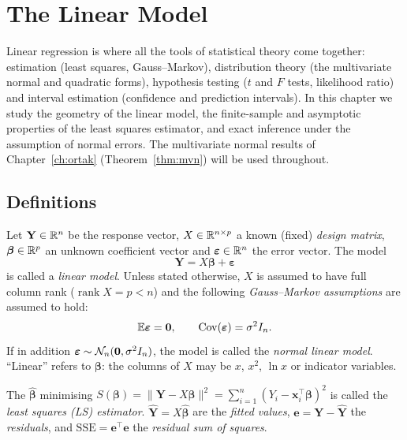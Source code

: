 \documentclass[main.tex]{subfiles}
\begin{document}
\chapter{The Linear Model}\label{ch:dogrusal}

Linear regression is where all the tools of statistical theory come together: estimation (least squares, Gauss--Markov), distribution theory (the multivariate normal and quadratic forms), hypothesis testing ($t$ and $F$ tests, likelihood ratio) and interval estimation (confidence and prediction intervals). In this chapter we study the geometry of the linear model, the finite-sample and asymptotic properties of the least squares estimator, and exact inference under the assumption of normal errors. The multivariate normal results of Chapter~\ref{ch:ortak} (Theorem~\ref{thm:mvn}) will be used throughout.

\section{Definitions}

\begin{definition}\label{def:dogrusal-model}
Let $\mathbf Y\in\mathbb{R}^n$ be the response vector, $X\in\mathbb{R}^{n\times p}$ a known (fixed) \emph{design matrix}, $\bm\beta\in\mathbb{R}^p$ an unknown coefficient vector and $\bm\varepsilon\in\mathbb{R}^n$ the error vector. The model
\[
\mathbf Y=X\bm\beta+\bm\varepsilon
\]
is called a \emph{linear model}. Unless stated otherwise, $X$ is assumed to have full column rank ($\operatorname{rank}X=p<n$) and the following \emph{Gauss--Markov assumptions} are assumed to hold:
\[
\mathbb{E}\bm\varepsilon=\mathbf 0,\qquad\operatorname{Cov}(\bm\varepsilon)=\sigma^2I_n .
\]
If in addition $\bm\varepsilon\sim\mathcal{N}_n(\mathbf 0,\sigma^2I_n)$, the model is called the \emph{normal linear model}. ``Linear'' refers to $\bm\beta$: the columns of $X$ may be $x$, $x^2$, $\ln x$ or indicator variables.
\end{definition}

\begin{definition}
The $\hat{\bm\beta}$ minimising $S(\bm\beta)=\|\mathbf Y-X\bm\beta\|^2=\sum_{i=1}^n(Y_i-\mathbf x_i^\top\bm\beta)^2$ is called the \emph{least squares (LS) estimator}. $\hat{\mathbf Y}=X\hat{\bm\beta}$ are the \emph{fitted values}, $\mathbf e=\mathbf Y-\hat{\mathbf Y}$ the \emph{residuals}, and $\mathrm{SSE}=\mathbf e^\top\mathbf e$ the \emph{residual sum of squares}.
\end{definition}
\end{document}
